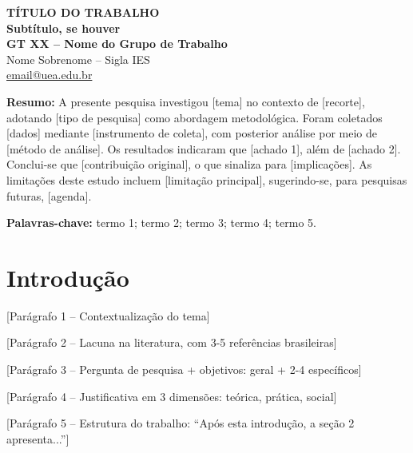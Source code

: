 \documentclass[12pt,a4paper]{article}
\newcommand{\titulodotrabalho}{TÍTULO DO TRABALHO\\\large Subtítulo, se houver}
\newcommand{\gtanped}{GT XX -- Nome do Grupo de Trabalho}
\newcommand{\nomedoautor}{Nome Sobrenome -- Sigla IES}
\begin{document}
\begin{center}
{\large \textbf{\titulodotrabalho}}\\[0.5cm]
\textbf{\gtanped}\\[0.3cm]
\nomedoautor\\
\href{mailto:email@uea.edu.br}{email@uea.edu.br}\\
\end{center}

\vspace{0.5cm}

\noindent\textbf{Resumo:} A presente pesquisa investigou [tema] no
contexto de [recorte], adotando [tipo de pesquisa] como abordagem
metodológica. Foram coletados [dados] mediante [instrumento de coleta],
com posterior análise por meio de [método de análise]. Os resultados
indicaram que [achado 1], além de [achado 2]. Conclui-se que
[contribuição original], o que sinaliza para [implicações]. As
limitações deste estudo incluem [limitação principal], sugerindo-se,
para pesquisas futuras, [agenda].

\vspace{0.3cm}

\noindent\textbf{Palavras-chave:} termo 1; termo 2; termo 3; termo 4;
termo 5.

\vspace{0.5cm}

\section*{Introdução}

[Parágrafo 1 -- Contextualização do tema]

[Parágrafo 2 -- Lacuna na literatura, com 3-5 referências brasileiras]

[Parágrafo 3 -- Pergunta de pesquisa + objetivos: geral + 2-4 específicos]

[Parágrafo 4 -- Justificativa em 3 dimensões: teórica, prática, social]

[Parágrafo 5 -- Estrutura do trabalho: ``Após esta introdução, a seção
2 apresenta...'']
\end{document}

